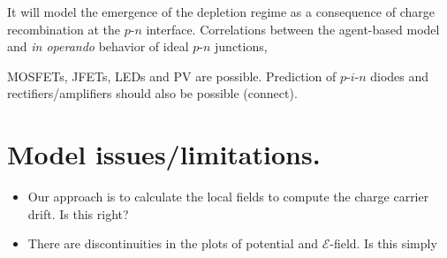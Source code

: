 \documentclass[12pt]{exam}
\begin{document}
It will model the emergence of the depletion regime as a consequence of charge recombination at the $p$-$n$ interface. Correlations between the agent-based model and \textit{in operando} behavior of ideal $p$-$n$ junctions,

MOSFETs, JFETs, LEDs and PV are possible. Prediction of $p$-$i$-$n$ diodes and rectifiers/amplifiers should also be possible (connect).

\section{Model issues/limitations.}
\begin{itemize}
    \item Our approach is to calculate the local fields to compute the charge carrier drift. Is this right?
    \item There are discontinuities in the plots of potential and $\mathcal{E}$-field. Is this simply 
\end{itemize}


\newpage
\printbibliography
\end{document}
